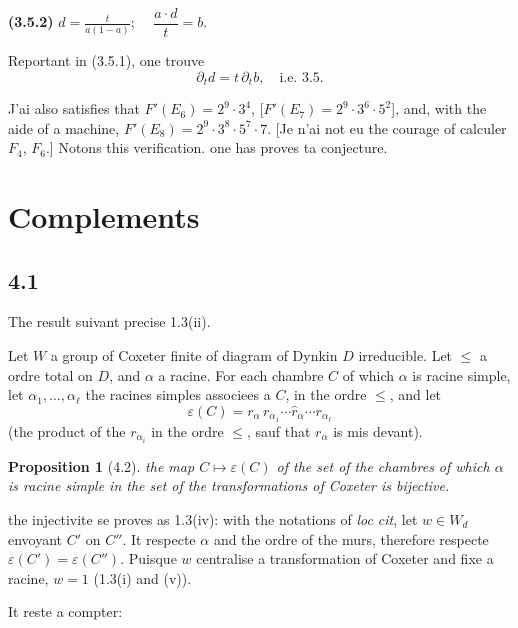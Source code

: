 \documentclass[11pt,a4paper]{article}
\theoremstyle{plain}
\newtheorem{proposition}[theorem]{Proposition}
\theoremstyle{definition}
\begin{document}
\smallskip

\noindent
\textbf{(3.5.2)} $\displaystyle d = \frac{t}{a(1-a)}$; $\quad \dfrac{a \cdot d}{t} = b$.

\smallskip

Reportant in (3.5.1), one trouve
\[
\partial_t d = t\, \partial_t b, \quad \text{i.e.\ 3.5}.
\]

\smallskip

J'ai also satisfies that $F'(E_6) = 2^9 \cdot 3^4$, [$F'(E_7) = 2^9 \cdot 3^6 \cdot 5^2$], and, with the aide of a machine, $F'(E_8) = 2^9 \cdot 3^8 \cdot 5^7 \cdot 7$. [Je n'ai not eu the courage of calculer $F_4$, $F_6$.] Notons this verification. one has proves ta conjecture.

\newpage

\section{Complements}

\subsection*{4.1}

The result suivant precise 1.3(ii).

Let $W$ a group of Coxeter finite of diagram of Dynkin $D$ irreducible. Let $\leq$ a ordre total on $D$, and $\alpha$ a racine. For each chambre $C$ of which $\alpha$ is racine simple, let $\alpha_1, \ldots, \alpha_\ell$ the racines simples associees a $C$, in the ordre $\leq$, and let
\[
\varepsilon(C) = r_\alpha\, r_{\alpha_1} \cdots \widehat{r}_\alpha \cdots r_{\alpha_\ell}
\]
(the product of the $r_{\alpha_i}$ in the ordre $\leq$, sauf that $r_\alpha$ is mis devant).

\begin{proposition}[4.2]
the map $C \mapsto \varepsilon(C)$ of the set of the chambres of which $\alpha$ is racine simple in the set of the transformations of Coxeter is bijective.
\end{proposition}

the injectivite se proves as 1.3(iv): with the notations of \textit{loc cit}, let $w \in W_d$ envoyant $C'$ on $C''$. It respecte $\alpha$ and the ordre of the murs, therefore respecte $\varepsilon(C') = \varepsilon(C'')$. Puisque $w$ centralise a transformation of Coxeter and fixe a racine, $w = 1$ (1.3(i) and (v)).

\smallskip

It reste a compter:
\end{document}
